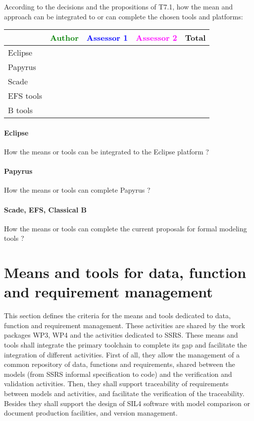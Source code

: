 According to the decisions and the propositions of T7.1, how the mean and approach can be integrated to or can complete the chosen tools and platforms:

\begin{tabular}{|l | c | c | c | c|}
\hline
& \textcolor{green}{Author} & \textcolor{blue}{Assessor 1} & \textcolor{magenta}{Assessor 2} & Total \\
\hline 
Eclipse & & & &  \\
\hline
Papyrus  & & & & \\
\hline
Scade & & & & \\
\hline
EFS tools & & & & \\
\hline
B tools & & & & \\
\hline
\end{tabular}


\paragraph{Eclipse}
How the means or tools can be integrated to the Eclipse platform ?

\paragraph{Papyrus}
How the means or tools can complete  Papyrus ?


\paragraph{Scade, EFS, Classical B}
How the means or tools can complete the current proposals for formal modeling tools ?


\section{Means and tools for data, function and requirement management}
\label{sec:management}


This section defines the criteria for the means and tools dedicated to data, function and requirement management. These activities are shared by the work packages WP3, WP4 and the activities dedicated to  SSRS.
These means and tools shall integrate the primary toolchain to  complete its gap and facilitate the integration of different activities. First of all, they  allow the management of a common repository of data, functions and requirements, shared between the models (from SSRS informal specification to code) and the verification and validation activities.  
Then, they shall support traceability of requirements between models and activities, and facilitate the verification of the traceability.
Besides they shall support the design of SIL4 software with model comparison or document production facilities, and version management.

